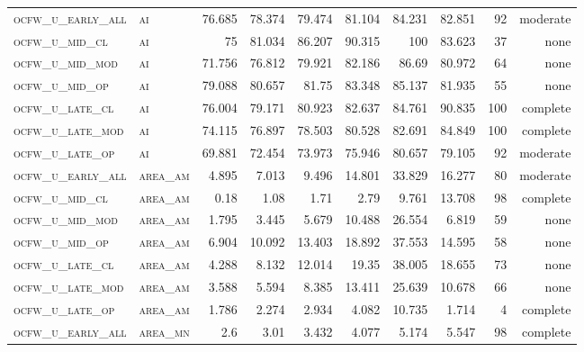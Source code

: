 \begin{landscape}
\begin{center}
\begin{footnotesize}
\begin{longtable}{llrrrrr|rrr}
\textsc{ocfw\_u\_early\_all} & \textsc{ai        }    & 76.685   & 78.374   & 79.474   & 81.104   & 84.231   & 82.851   & 92  & moderate \\
\textsc{ocfw\_u\_mid\_cl   } & \textsc{ai        }    & 75       & 81.034   & 86.207   & 90.315   & 100      & 83.623   & 37  & none     \\
\textsc{ocfw\_u\_mid\_mod  } & \textsc{ai        }    & 71.756   & 76.812   & 79.921   & 82.186   & 86.69    & 80.972   & 64  & none     \\
\textsc{ocfw\_u\_mid\_op   } & \textsc{ai        }    & 79.088   & 80.657   & 81.75    & 83.348   & 85.137   & 81.935   & 55  & none     \\
\textsc{ocfw\_u\_late\_cl  } & \textsc{ai        }    & 76.004   & 79.171   & 80.923   & 82.637   & 84.761   & 90.835   & 100 & complete \\
\textsc{ocfw\_u\_late\_mod } & \textsc{ai        }    & 74.115   & 76.897   & 78.503   & 80.528   & 82.691   & 84.849   & 100 & complete \\
\textsc{ocfw\_u\_late\_op  } & \textsc{ai        }    & 69.881   & 72.454   & 73.973   & 75.946   & 80.657   & 79.105   & 92  & moderate \\
\textsc{ocfw\_u\_early\_all} & \textsc{area\_am  }    & 4.895    & 7.013    & 9.496    & 14.801   & 33.829   & 16.277   & 80  & moderate \\
\textsc{ocfw\_u\_mid\_cl   } & \textsc{area\_am  }    & 0.18     & 1.08     & 1.71     & 2.79     & 9.761    & 13.708   & 98  & complete \\
\textsc{ocfw\_u\_mid\_mod  } & \textsc{area\_am  }    & 1.795    & 3.445    & 5.679    & 10.488   & 26.554   & 6.819    & 59  & none     \\
\textsc{ocfw\_u\_mid\_op   } & \textsc{area\_am  }    & 6.904    & 10.092   & 13.403   & 18.892   & 37.553   & 14.595   & 58  & none     \\
\textsc{ocfw\_u\_late\_cl  } & \textsc{area\_am  }    & 4.288    & 8.132    & 12.014   & 19.35    & 38.005   & 18.655   & 73  & none     \\
\textsc{ocfw\_u\_late\_mod } & \textsc{area\_am  }    & 3.588    & 5.594    & 8.385    & 13.411   & 25.639   & 10.678   & 66  & none     \\
\textsc{ocfw\_u\_late\_op  } & \textsc{area\_am  }    & 1.786    & 2.274    & 2.934    & 4.082    & 10.735   & 1.714    & 4   & complete \\
\textsc{ocfw\_u\_early\_all} & \textsc{area\_mn  }    & 2.6      & 3.01     & 3.432    & 4.077    & 5.174    & 5.547    & 98  & complete \\

\end{longtable}
\end{footnotesize}
\end{center}
\end{landscape}
